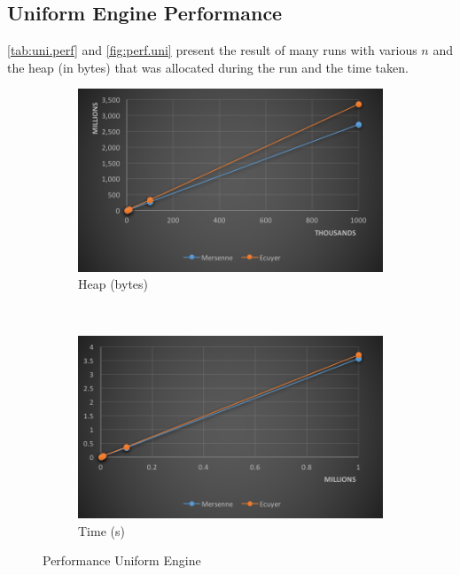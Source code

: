 \documentclass[12pt,a4paper,titlepage]{article}
\begin{document}
\subsection{Uniform Engine Performance}
\autoref{tab:uni.perf} and \autoref{fig:perf.uni} 
 present the result of many runs with various $n$ and
the heap (in bytes) that was allocated during the run and the time taken.
\begin{figure}[h!]
\centering
    \begin{subfigure}[b]{0.47\textwidth}
        \includegraphics[width=\textwidth]{img/perf-heap-uni.png}
        \caption{Heap (bytes)}
        \label{fig:perf.heap.uni}
    \end{subfigure}
    ~ 
    \begin{subfigure}[b]{0.47\textwidth}
        \includegraphics[width=\textwidth]{img/perf-time-uni.png}
        \caption{Time (s)}
        \label{fig:perf.time.uni}
    \end{subfigure}
\caption{Performance Uniform Engine}
\label{fig:perf.uni}
\end{figure}
\end{document}
